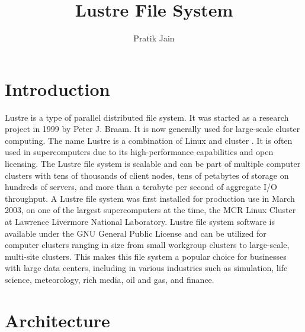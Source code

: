 \documentclass[9pt,twocolumn,twoside]{styles/osajnl}
\title{Lustre File System}
\author{Pratik Jain}
\affil{School of Informatics and Computing, Bloomington, IN 47408, U.S.A.}
\affil{Corresponding authors: jainps@iu.edu}
\begin{document}
\maketitle

\section{Introduction}

Lustre is a type of parallel distributed file system. It was started
as a research project in 1999 by Peter J. Braam. It is now generally
used for large-scale cluster computing. The name Lustre is a
combination of Linux and cluster \cite{www-ungrid}. It is often used
in supercomputers due to its high-performance capabilities and open
licensing. The Lustre file system is scalable and can be part of
multiple computer clusters with tens of thousands of client nodes,
tens of petabytes of storage on hundreds of servers, and more than a
terabyte per second of aggregate I/O throughput.  A Lustre file system
was first installed for production use in March 2003, on one of the
largest supercomputers at the time, the MCR Linux Cluster at Lawrence
Livermore National Laboratory. Lustre file system software is
available under the GNU General Public License and can be utilized for
computer clusters ranging in size from small workgroup clusters to
large-scale, multi-site clusters. This makes this file system a
popular choice for businesses with large data centers, including in
various industries such as simulation, life science, meteorology, rich
media, oil and gas, and finance.

\section{Architecture}
\end{document}
